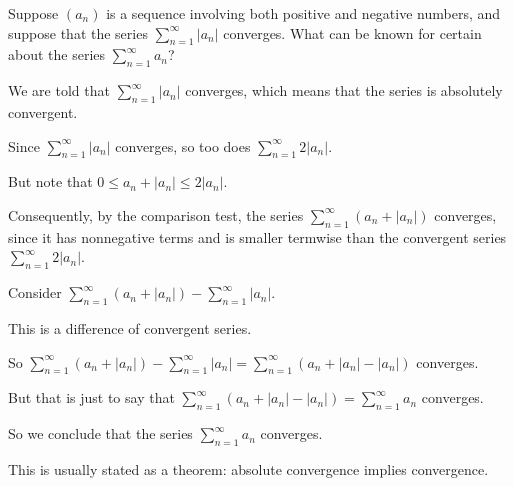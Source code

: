 \documentclass{ximera}
\begin{document}
            \begin{question}
              Suppose \((a_n)\) is a sequence involving both positive and negative numbers, and suppose that the series \(\displaystyle\sum_{n=1}^\infty |a_n|\) converges.  What can be known for certain about the series \(\displaystyle\sum_{n=1}^\infty a_n\)?
              \begin{solution}
                \begin{hint}
                  We are told that \(\displaystyle\sum_{n=1}^\infty |a_n|\) converges, which means that the series is absolutely convergent.
                \end{hint}
                \begin{hint}
                  Since \(\displaystyle\sum_{n=1}^\infty |a_n|\) converges, so too does \(\displaystyle\sum_{n=1}^\infty 2|a_n|\).
                \end{hint}
                \begin{hint}
                  But note that \(0 \leq a_n+|a_n| \leq 2|a_n|\).
                \end{hint}
                \begin{hint}
                  Consequently, by the comparison test, the series \(\displaystyle\sum_{n=1}^\infty \left( a_n + |a_n| \right)\) converges, since it has nonnegative terms and is smaller termwise than the convergent series \(\displaystyle\sum_{n=1}^\infty 2|a_n|\).
                \end{hint}
                \begin{hint}
                  Consider \(\displaystyle\sum_{n=1}^\infty (a_n+|a_n|) -\displaystyle\sum_{n=1}^\infty |a_n|\).
                \end{hint}
                \begin{hint}
                  This is a difference of convergent series.
                \end{hint}
                \begin{hint}
                  So \(\displaystyle\sum_{n=1}^\infty (a_n+|a_n|) -\displaystyle\sum_{n=1}^\infty |a_n| = \displaystyle\sum_{n=1}^\infty \left( a_n+|a_n|-|a_n| \right)\) converges.
                \end{hint}
                \begin{hint}
                  But that is just to say that \(\displaystyle\sum_{n=1}^\infty \left( a_n+|a_n|-|a_n| \right) = \displaystyle\sum_{n=1}^\infty a_n \) converges.
                \end{hint}
                \begin{hint}
                  So we conclude that the series \(\displaystyle\sum_{n=1}^\infty a_n \) converges.
                \end{hint}
                \begin{hint}
                  This is usually stated as a theorem: absolute convergence implies convergence.


\end{hint}
\end{solution}
\end{question}
\end{document}
